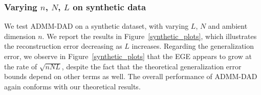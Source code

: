 \documentclass[preprint,12pt]{elsarticle}
\begin{document}
\begin{table}[h!]
    \centering
    
    \medskip
    \caption{Test MSEs and empirical generalization errors for 10-, 20- and 30-layer decoders, with fixed $25\%$ CS ratio and redundancy ratio $N/n=50$. Bold letters indicate the best performance between the two decoders.}
    \label{decoders}
\end{table}

\subsubsection{Varying $n$, $N$, $L$ on synthetic data}\label{synexp}
We test ADMM-DAD on a synthetic dataset, with varying $L$, $N$ and ambient dimension $n$. We report the results in Figure~\ref{synthetic_plots}, which illustrates the reconstruction error decreasing as $L$ increases. Regarding the generalization error, we observe in Figure~\ref{synthetic_plots} that the EGE appears to grow at the rate of $\sqrt{nNL}$, despite the fact that the theoretical generalization error bounds depend on other terms as well. The overall performance of ADMM-DAD again conforms with our theoretical results.
\end{document}
